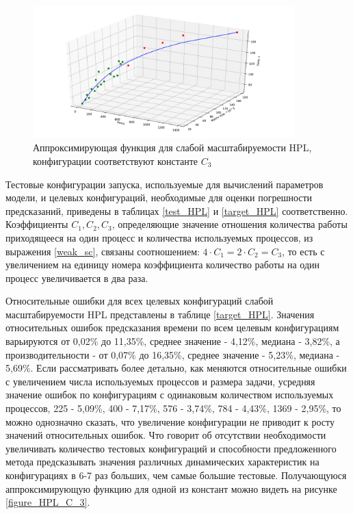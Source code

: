 	\begin{figure}
		\centering
		\includegraphics[width=0.9\textwidth]{./images/hpl_k3}
		\caption{Аппроксимирующая функция для слабой масштабируемости HPL, конфигурации соответствуют константе \(C_3\)}
		\label{figure_HPL_C_3}
	\end{figure}

	Тестовые конфигурации запуска, используемые для вычислений параметров модели, и целевых конфигураций, необходимые для оценки погрешности предсказаний, приведены в таблицах \eqref{test_HPL} и \eqref{target_HPL} соответственно. Коэффициенты \(C_1, C_2, C_3\), определяющие значение отношения количества работы приходящееся на один процесс и количества используемых процессов, из выражения \eqref{weak_sc}, связаны соотношением: \(4 \cdot C_1 = 2 \cdot C_2 = C_3 \), то есть с увеличением на единицу номера коэффициента количество работы на один процесс увеличивается в два раза.

	Относительные ошибки для всех целевых конфигураций слабой масштабируемости HPL представлены в таблице \eqref{target_HPL}. Значения относительных ошибок предсказания времени по всем целевым конфигурациям варьируются от 0,02\% до 11,35\%, среднее значение - 4,12\%, медиана - 3,82\%, а производительности - от 0,07\% до 16,35\%, среднее значение - 5,23\%, медиана - 5,69\%. Если рассматривать более детально, как меняются относительные ошибки с увеличением числа используемых процессов и размера задачи, усредняя значение ошибок по конфигурациям с одинаковым количеством используемых процессов, 225 - 5,09\%, 400 - 7,17\%, 576 - 3,74\%, 784 - 4,43\%, 1369 - 2,95\%, то можно однозначно сказать, что увеличение конфигурации не приводит к росту значений относительных ошибок. Что говорит об отсутствии необходимости увеличивать количество тестовых конфигураций и способности предложенного метода предсказывать значения различных динамических характеристик на конфигурациях в 6-7 раз больших, чем самые большие тестовые. Получающуюся аппроксимирующую функцию для одной из констант можно видеть на рисунке \eqref{figure_HPL_C_3}.

